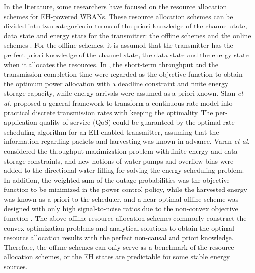 \documentclass[journal,10pt]{IEEEtran}
\begin{document}
In the literature, some researchers have focused on the resource allocation schemes for EH-powered WBANs. These resource allocation schemes can be divided into two categories in terms of the priori knowledge of the channel state, data state and energy state for the transmitter: the offline schemes \cite{mosavat2017maximizing,varan2016delay,shan2015discrete,tutuncuoglu2012optimum,wei2015power,huang2014optimal} and the online schemes \cite{leng2017resource,ibarra2016qos,alhawari2016power,dionisi2016autonomous,shaviv2016universally,liu2015optimal,ozel2011transmission}. 
For the offline schemes, it is assumed that the transmitter has the perfect priori knowledge of the channel state, the data state and the energy state when it allocates the resources. 
In \cite{tutuncuoglu2012optimum}, the short-term throughput and the transmission completion time were regarded as the objective function to obtain the optimum power allocation with a deadline constraint and finite energy storage capacity, while energy arrivals were assumed as a priori known. 
Shan \textsl{et al.} \cite{shan2015discrete} proposed a general framework to transform a continuous-rate model into practical discrete transmission rates with keeping the optimality. The per-application quality-of-service (QoS) could be guaranteed by the optimal rate scheduling algorithm for an EH enabled transmitter, assuming that the information regarding packets and harvesting was known in advance. 
Varan \textsl{et al.} \cite{varan2016delay} considered the throughput maximization problem with finite energy and data storage constraints, and new notions of water pumps and overflow bins were added to the directional water-filling for solving the energy scheduling problem.  
In addition, the weighted sum of the outage probabilities was the objective function to be minimized in the power control policy, while the harvested energy was known as a priori to the scheduler, and a near-optimal offline scheme was designed with only high signal-to-noise ratios due to the non-convex objective function \cite{wei2015power,huang2014optimal}.
The above offline resource allocation schemes commonly construct the convex optimization problems and analytical solutions to obtain the optimal resource allocation results with the perfect non-causal and priori knowledge. Therefore, the offline schemes can only serve as a benchmark of the resource allocation schemes, or the EH states are predictable for some stable energy sources.   
\end{document}
